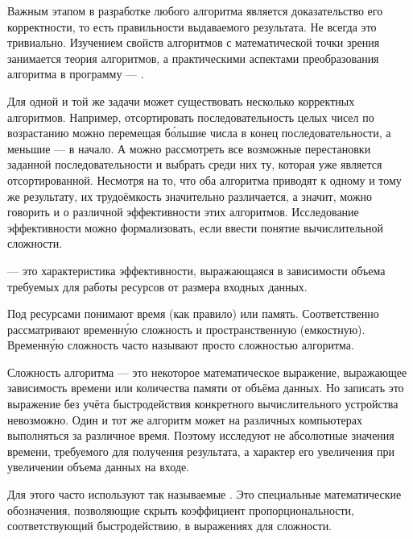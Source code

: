 Важным этапом в разработке любого алгоритма является доказательство
его корректности, то есть правильности выдаваемого результата. Не
всегда это тривиально. Изучением свойств алгоритмов с математической
точки зрения занимается теория алгоритмов, а практическими аспектами
преобразования алгоритма в программу — .


Для одной и той же задачи может существовать несколько корректных
алгоритмов. Например, отсортировать последовательность целых чисел по
возрастанию можно перемещая бо́льшие числа в конец последовательности,
а меньшие — в начало. А можно рассмотреть все возможные перестановки
заданной последовательности и выбрать среди них ту, которая уже
является отсортированной. Несмотря на то, что оба алгоритма приводят к
одному и тому же результату, их трудоёмкость значительно различается,
а значит, можно говорить и о различной эффективности этих
алгоритмов. Исследование эффективности можно формализовать, если
ввести понятие вычислительной сложности.

\begin{defn}
   — это
  характеристика эффективности, выражающаяся в зависимости объема
  требуемых для работы ресурсов от размера входных данных.
\end{defn}

Под ресурсами понимают время (как правило) или память. Соответственно
рассматривают временну́ю сложность и пространственную (емкостную).
Временну́ю сложность часто называют просто сложностью алгоритма.


Сложность алгоритма — это некоторое математическое выражение,
выражающее зависимость времени или количества памяти от объёма
данных. Но записать это выражение без учёта быстродействия конкретного
вычислительного устройства невозможно.  Один и тот же алгоритм может
на различных компьютерах выполняться за различное время. Поэтому
исследуют не абсолютные значения времени, требуемого для получения
результата, а характер его увеличения при увеличении объема данных на
входе.

Для этого часто используют так называемые . Это специальные математические обозначения,
позволяющие скрыть коэффициент пропорциональности, соответствующий
быстродействию, в выражениях для сложности.

